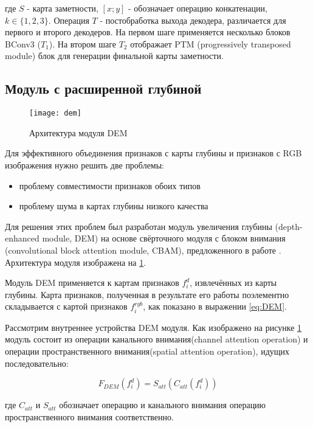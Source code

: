 где $S$ - карта заметности, $[x; y]$ - обозначает операцию конкатенации, $k \in \{1,2,3\}$. Операция $T$ - постобработка выхода декодера,
различается для первого и второго декодеров. На первом шаге применяется несколько блоков BConv3 ($T_1$). На втором шаге $T_2$ отображает 
PTM (progressively transposed module) блок для генерации финальной карты заметности.


\subsection{Модуль с расширенной глубиной}

\begin{figure}[h]
    \centering
    \texttt{[image: dem]}
    \caption{Архитектура модуля DEM}
    \label{fig:dem}
\end{figure}

Для эффективного объединения признаков с карты глубины и признаков с RGB изображения нужно решить две проблемы:

\begin{itemize}
    \item проблему совместимости признаков обоих типов 
    \item проблему шума в картах глубины низкого качества 
\end{itemize}

Для решения этих проблем был разработан  модуль увеличения глубины (depth-enhanced module, DEM) на основе
свёрточного модуля с блоком внимания (convolutional block attention module, CBAM), предложенного в работе \cite{Cbam}. 
Архитектура модуля изображена на \ref{fig:dem}.

Модуль DEM применяется к картам признаков $f_i^d$, извлечённых из карты глубины. Карта признаков, полученная в результате его работы
поэлементно складывается с картой признаков $f_i^{rgb}$, как показано в выражении \eqref{eq:DEM}.

Рассмотрим внутреннее устройства DEM модуля. Как изображено на рисунке \ref{fig:dem} модуль состоит из
операции канального внимания(channel attention operation) и операции пространственного внимания(spatial attention operation), идущих последовательно:

\begin{equation}
    F_{DEM}(f_i^d)=S_{att}(C_{att}(f_i^d))
\end{equation}

где $C_{att}$ и $S_{att}$ обозначает операцию и канального внимания операцию пространственного внимания
соответственно.


